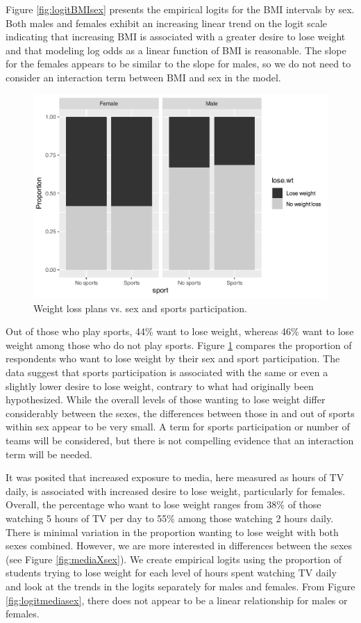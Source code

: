 \documentclass[
]{krantz}
\begin{document}
Figure \ref{fig:logitBMIsex} presents the empirical logits for the BMI intervals by sex. Both males and females exhibit an increasing linear trend on the logit scale indicating that increasing BMI is associated with a greater desire to lose weight and that modeling log odds as a linear function of BMI is reasonable. The slope for the females appears to be similar to the slope for males, so we do not need to consider an interaction term between BMI and sex in the model.

\begin{figure}

{\centering \includegraphics[width=0.6\linewidth]{bookdown-BeyondMLR_files/figure-latex/mosaicsexsports-1} 

}

\caption{Weight loss plans vs. sex and sports participation.}\label{fig:mosaicsexsports}
\end{figure}

Out of those who play sports, 44\% want to lose weight, whereas 46\% want to lose weight among those who do not play sports. Figure \ref{fig:mosaicsexsports} compares the proportion of respondents who want to lose weight by their sex and sport participation. The data suggest that sports participation is associated with the same or even a slightly lower desire to lose weight, contrary to what had originally been hypothesized. While the overall levels of those wanting to lose weight differ considerably between the sexes, the differences between those in and out of sports within sex appear to be very small. A term for sports participation or number of teams will be considered, but there is not compelling evidence that an interaction term will be needed.

It was posited that increased exposure to media, here measured as hours of TV daily, is associated with increased desire to lose weight, particularly for females. Overall, the percentage who want to lose weight ranges from 38\% of those watching 5 hours of TV per day to 55\% among those watching 2 hours daily. There is minimal variation in the proportion wanting to lose weight with both sexes combined. However, we are more interested in differences between the sexes (see Figure \ref{fig:mediaXsex}). We create empirical logits using the proportion of students trying to lose weight for each level of hours spent watching TV daily and look at the trends in the logits separately for males and females. From Figure \ref{fig:logitmediasex}, there does not appear to be a linear relationship for males or females.
\end{document}
